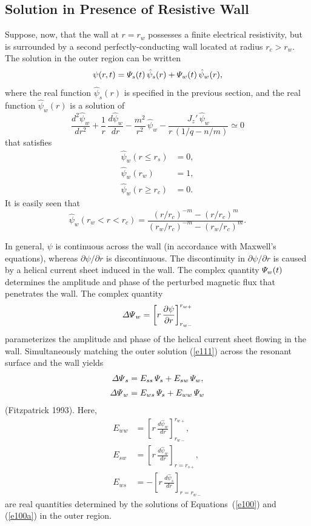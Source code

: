 \documentclass[notitlepage,12pt]{article}
\begin{document}
\subsection{Solution in Presence of Resistive Wall}\label{resistive}
Suppose, now, that the wall at $r=r_w$ possesses a finite electrical resistivity, but is surrounded by a second perfectly-conducting wall
located at radius $r_c>r_w$.
The solution in the outer region can be written
\begin{equation}\label{e111}
\psi(r,t) = {\mit\Psi}_s(t)\,\hat{\psi}_s(r) + {\mit\Psi}_w(t)\,\hat{\psi}_w(r),
\end{equation}
where the real function $\hat{\psi}_s(r)$ is specified in the previous section, and the real function  $\hat{\psi}_w(r)$ is a solution of 
\begin{equation}\label{e100a}
\frac{d^2\hat{\psi}_w}{dr^2} + \frac{1}{r}\,\frac{d\hat{\psi}_w}{dr}-\frac{m^2}{r^2}\,\hat{\psi}_w - \frac{J_z'\,\hat{\psi}_w}{r\,(1/q-n/m)}\simeq 0
\end{equation}
that satisfies
\begin{align}\label{e101a}
\hat{\psi}_w(r\leq r_s) &= 0,\\[0.5ex]
\hat{\psi}_w(r_w) &= 1,\label{e102a}\\[0.5ex]
\hat{\psi}_w(r\geq r_c) &= 0.\label{e103a}
\end{align}
It is easily seen that
\begin{equation}\label{e117}
\hat{\psi}_w(r_w< r < r_c) = \frac{(r/r_c)^{-m} - (r/r_c)^m}{(r_w/r_c)^{-m} - (r_w/r_c)^m}.
\end{equation}

In general, $\psi$ is continuous across the wall (in accordance with Maxwell's equations), whereas $\partial\psi/\partial r$ is discontinuous. The discontinuity in $\partial\psi/\partial r$ is caused by a helical current sheet induced in the wall. The complex quantity ${\mit\Psi}_w(t)$ determines the amplitude and
phase of the perturbed magnetic flux that penetrates the wall. The complex quantity
\begin{equation}\label{e118}
{\mit\Delta\Psi}_w = \left[r\,\frac{\partial\psi}{\partial r}\right]_{r_{w-}}^{r_{w+}}
\end{equation}
parameterizes the amplitude and phase of the helical current sheet flowing in the wall.
Simultaneously matching the outer solution (\ref{e111}) across the resonant surface and the wall yields
\begin{align}
{\mit\Delta\Psi}_s &= E_{ss}\,{\mit\Psi}_s + E_{sw}\,{\mit\Psi}_w,\\[0.5ex]
{\mit\Delta\Psi}_w &= E_{ws}\,{\mit\Psi}_s+ E_{ww}\,{\mit\Psi}_w
\end{align}
(Fitzpatrick 1993).
Here,
\begin{align}
E_{ww}&= \left[r\,\frac{d\hat{\psi}_w}{dr}\right]_{r_{w-}}^{r_{w+}},\\[0.5ex]
E_{sw} &=\left[r\,\frac{{d\hat\psi}_w}{dr}\right]_{r=r_{s+}},\label{e121}\\[0.5ex]
E_{ws} &=-\left[r\,\frac{{d\hat\psi}_s}{dr}\right]_{r=r_{w-}}\label{e122}
\end{align}
are real quantities determined by the solutions of Equations~(\ref{e100}) and (\ref{e100a}) in the outer region.
\end{document}
